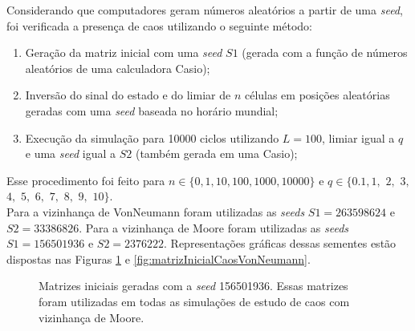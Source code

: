 \documentclass[
	12pt,				%
	openright,			%
	twoside,			%
	a4paper,			%
	english,			%
	french,				%
	spanish,			%
	brazil				%
	]{abntex2}
\begin{document}
Considerando que computadores geram números aleatórios a partir de uma \textit{seed}, foi verificada a presença de caos utilizando o seguinte método:
  \begin{enumerate}
    \item Geração da matriz inicial com uma \textit{seed} $S1$ (gerada com a função de números aleatórios de uma calculadora Casio);
    \item Inversão do sinal do estado e do limiar de $n$ células em posições aleatórias geradas com uma \textit{seed} baseada no horário mundial;
    \item Execução da simulação para 10000 ciclos utilizando $L=100$, limiar igual a $q$ e uma \textit{seed} igual a $S2$ (também gerada em uma Casio);
  \end{enumerate}
	Esse procedimento foi feito para $n\in\{0, 1, 10, 100, 1000, 10000\}$ e $q\in\{0.1, 1,$ $2,$ $3,$ $4,$ $5,$ $6,$ $7,$ $8,$ $9,$ $10\}$.\\
  Para a vizinhança de VonNeumann foram utilizadas as \textit{seeds} $S1=263598624$ e $S2=33386826$. Para a vizinhança de Moore foram utilizadas as \textit{seeds} $S1=156501936$ e $S2=2376222$. Representações gráficas dessas sementes estão dispostas nas Figuras \ref{fig:matrizInicialCaosMoore} e \ref{fig:matrizInicialCaosVonNeumann}.
  \begin{figure}[h]
    \hfill
    \caption{Matrizes iniciais geradas com a \textit{seed} 156501936. Essas matrizes foram utilizadas em todas as simulações de estudo de caos com vizinhança de Moore.}
    \label{fig:matrizInicialCaosMoore}
  \end{figure}
\end{document}
